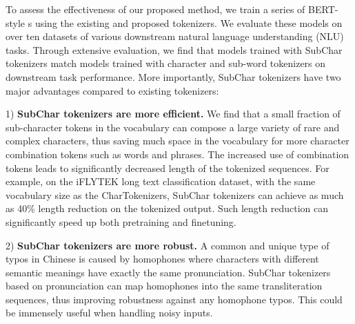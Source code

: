 To assess the effectiveness of our proposed method, we train a series of BERT-style \plm s using the existing and proposed tokenizers.
We evaluate these models on over ten datasets of various downstream natural language understanding (NLU) tasks. 
Through extensive evaluation, we find that models trained with SubChar tokenizers match models trained with character and sub-word tokenizers on downstream task performance. 
More importantly, SubChar tokenizers have two major advantages compared to existing tokenizers:

  1) \textbf{SubChar tokenizers are more efficient.} We find that a small fraction of sub-character tokens in the vocabulary can compose a large variety of rare and complex characters, thus saving much space in the vocabulary for more character combination tokens such as words and phrases. The increased use of combination tokens leads to significantly decreased length of the tokenized sequences. For example, on the iFLYTEK long text classification dataset, with the same vocabulary size as the CharTokenizers, SubChar tokenizers can achieve as much as 40\% length reduction on the tokenized output. Such length reduction can significantly speed up both pretraining and finetuning.

 2) \textbf{SubChar tokenizers are more robust.} A common and unique type of typos in Chinese is caused by homophones where characters with different semantic meanings have exactly the same pronunciation. SubChar tokenizers based on pronunciation can map homophones into the same transliteration sequences, thus improving robustness against any homophone typos. This could be immensely useful when handling noisy inputs. 




